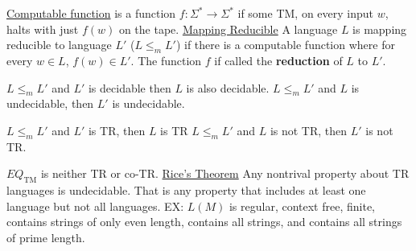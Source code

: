 \documentclass[9pt]{article}
\begin{document}
\uline{Computable function} is a function $f:\Sigma^*\rightarrow\Sigma^*$ if some TM, on every input $w$, halts with just $f(w)$ on the tape.\newline
\uline{Mapping Reducible} A language $L$ is mapping reducible to language $L'$ ($L\leq_mL'$) if there is a computable function where for every $w\in L$, $f(w)\in L'$. The function $f$ if called the \textbf{reduction} of $L$ to $L'$.\newline
\begin{minipage}[t]{.48\textwidth}
    $L\leq_m L'$ and $L'$ is decidable then $L$ is also decidable.\newline
    $L\leq_mL'$ and $L$ is undecidable, then $L'$ is undecidable.
\end{minipage}\hspace{.8cm}
\begin{minipage}[t]{.48\textwidth}
    $L\leq_mL'$ and $L'$ is TR, then $L$ is TR\newline
    $L\leq_mL'$ and $L$ is not TR, then $L'$ is not TR.
\end{minipage}\newline
$EQ_{\text{TM}}$ is neither TR or co-TR.\newline
\uline{Rice's Theorem} Any nontrival property about TR languages is undecidable. That is any property that includes at least one language but not all languages. EX: $L(M)$ is regular, context free, finite, contains strings of only even length, contains all strings, and contains all strings of prime length.
\end{document}
